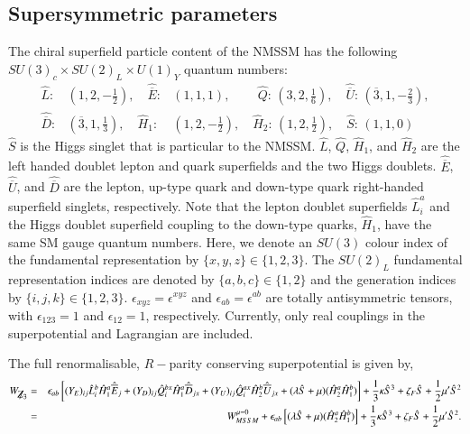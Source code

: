 \documentclass[final,3p,times,pdflatex]{elsarticle}
\newcommand{\ba}{\begin{eqnarray}}
\newcommand{\ea}{\end{eqnarray}}
\newcommand{\Zv}{{\mbox{${\not\!\!Z_3}$}}}
\begin{document}
\subsection{Supersymmetric parameters \label{susypars}}
The chiral superfield particle content of the NMSSM has the 
following $SU(3)_c\times SU(2)_L\times U(1)_Y$ quantum numbers:
\begin{eqnarray}
\hat{L}:&(1,2,-\frac{1}{2}),\quad \hat{{\overline E}}:&(1,1,1),\qquad\, \hat{Q}:\,(3,2,\frac{1}{6}),\quad
\hat{{\overline U}}:\,(\overline 3,1,-\frac{2}{3}),\nonumber\\ \hat{{\overline D}}:&(\overline 3,1,\frac{1}{3}),\quad
\hat{H}_1:&(1,2,-\frac{1}{2}),\quad \hat{H}_2:\,(1,2,\frac{1}{2}),\quad \hat{S}:\,(1,1,0)
\label{fields}
\end{eqnarray}
$\hat S$ is the Higgs singlet that is particular to the NMSSM.
$\hat L$, $\hat Q$, $\hat H_1$, and $\hat H_2$ are the left handed doublet lepton and
quark superfields and the two Higgs doublets. $\hat{\overline E}$, $\hat{\overline U}$, and
$\hat{\overline D}$ are the lepton, up-type quark and down-type quark
right-handed superfield singlets, respectively. 
Note that the lepton
doublet superfields $\hat{L}^a_i$ and the Higgs doublet superfield coupling
to the down-type quarks, $\hat{H}_1$, have the same SM gauge 
quantum numbers. 
Here, we denote an $SU(3)$ colour index of the fundamental
representation by  $\{x,y,z\} \in \{1,2,3 \}$. The $SU(2)_L$ fundamental
representation indices are denoted by $\{a,b,c\} \in \{1,2\}$ and the generation
indices by $\{i,j,k\} \in \{1,2,3\}$. 
$\epsilon_{xyz}=\epsilon^{xyz}$ and  $\epsilon_{ab}=\epsilon^{ab}$ are totally
antisymmetric tensors, with $\epsilon_{123}=1$ and $\epsilon_{12}=1$,
respectively.  Currently, only real couplings in the superpotential and Lagrangian are included. 

The full renormalisable, $R-$parity conserving superpotential is given by,
\ba 
 W_{\Zv}  &=&  \epsilon_{ab} \left[ (Y_E)_{ij} \hat L_i^b
\hat H_1^a \hat{\overline E}_j + (Y_D)_{ij} \hat Q_i^{bx} \hat H_1^a \hat{\overline D}_{jx} +
(Y_U)_{ij} \hat Q_i^{ax} \hat H_2^b \hat{\overline U}_{jx} 
+(\lambda \hat{S} + \mu)(\hat{H}^a_2 \hat{H}^b_1) \right ] +\frac{1}{3}\kappa\hat{S}^3 + \zeta_F\hat{S} + \frac{1}{2} \mu^\prime\hat{S}^2 \\
 &=& W_{MSSM}^{\mu =0}  +  \epsilon_{ab}\left [(\lambda \hat{S} + \mu)(\hat{H}^a_2 \hat{H}^b_1) \right ]+\frac{1}{3}\kappa\hat{S}^3 + \zeta_F\hat{S} + \frac{1}{2} \mu^\prime\hat{S}^2. 
\label{eq:WZ3V}
\ea
 
\end{document}
